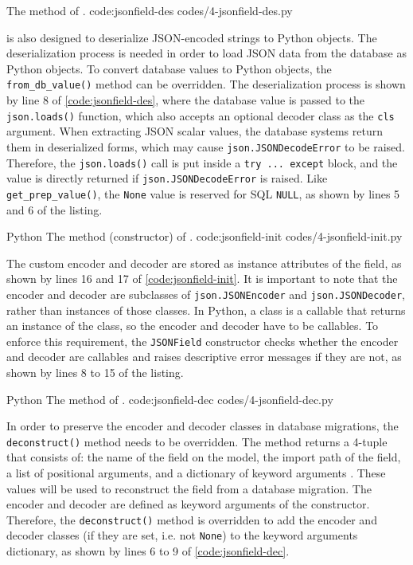 {The  method of .}
{code:jsonfield-des}
{codes/4-jsonfield-des.py}

 is also designed to deserialize JSON-encoded strings to Python
objects. The deserialization process is needed in order to load JSON data from
the database as Python objects. To convert database values to Python objects,
the \verb|from_db_value()| method can be overridden. The deserialization
process is shown by line 8 of \autoref{code:jsonfield-des}, where the database
value is passed to the \verb|json.loads()| function, which also accepts an
optional decoder class as the \verb|cls| argument. When extracting JSON scalar
values, the database systems return them in deserialized forms, which may cause
\verb|json.JSONDecodeError| to be raised. Therefore, the \verb|json.loads()|
call is put inside a \verb|try ... except| block, and the value is directly
returned if \verb|json.JSONDecodeError| is raised. Like
\verb|get_prep_value()|, the \verb|None| value is reserved for SQL \verb|NULL|,
as shown by lines 5 and 6 of the listing.

\listing
{Python}
{The  method (constructor) of .}
{code:jsonfield-init}
{codes/4-jsonfield-init.py}

The custom encoder and decoder are stored as instance attributes of the field,
as shown by lines 16 and 17 of \autoref{code:jsonfield-init}. It is important
to note that the encoder and decoder are subclasses of \verb|json.JSONEncoder|
and \verb|json.JSONDecoder|, rather than instances of those classes. In Python,
a class is a callable that returns an instance of the class, so the encoder and
decoder have to be callables. To enforce this requirement, the \verb|JSONField|
constructor checks whether the encoder and decoder are callables and raises
descriptive error messages if they are not, as shown by lines 8 to 15 of the
listing.

\listing
{Python}
{The  method of .}
{code:jsonfield-dec}
{codes/4-jsonfield-dec.py}

In order to preserve the encoder and decoder classes in database migrations,
the \verb|deconstruct()| method needs to be overridden. The method returns a
4-tuple that consists of: the name of the field on the model, the import path
of the field, a list of positional arguments, and a dictionary of keyword
arguments \cite{django:model_fields}. These values will be used to reconstruct
the field from a database migration. The encoder and decoder are defined as
keyword arguments of the constructor. Therefore, the \verb|deconstruct()|
method is overridden to add the encoder and decoder classes (if they are set,
i.e. not \verb|None|) to the keyword arguments dictionary, as shown by lines 6
to 9 of \autoref{code:jsonfield-dec}.

